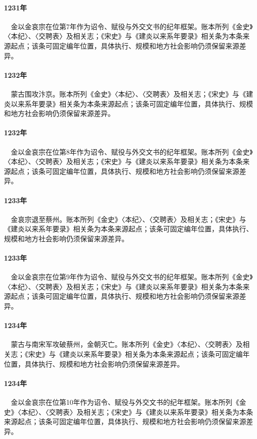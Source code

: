 \paragraph{1231年}　金以金哀宗在位第7年作为诏令、赋役与外交文书的纪年框架。账本所列《金史》〈本纪〉、〈交聘表〉及相关志；《宋史》与《建炎以来系年要录》相关条为本条来源起点；该条可固定编年位置，具体执行、规模和地方社会影响仍须保留来源差异。

\paragraph{1232年}　蒙古围攻汴京。账本所列《金史》〈本纪〉、〈交聘表〉及相关志；《宋史》与《建炎以来系年要录》相关条为本条来源起点；该条可固定编年位置，具体执行、规模和地方社会影响仍须保留来源差异。

\paragraph{1232年}　金以金哀宗在位第8年作为诏令、赋役与外交文书的纪年框架。账本所列《金史》〈本纪〉、〈交聘表〉及相关志；《宋史》与《建炎以来系年要录》相关条为本条来源起点；该条可固定编年位置，具体执行、规模和地方社会影响仍须保留来源差异。

\paragraph{1233年}　金哀宗退至蔡州。账本所列《金史》〈本纪〉、〈交聘表〉及相关志；《宋史》与《建炎以来系年要录》相关条为本条来源起点；该条可固定编年位置，具体执行、规模和地方社会影响仍须保留来源差异。

\paragraph{1233年}　金以金哀宗在位第9年作为诏令、赋役与外交文书的纪年框架。账本所列《金史》〈本纪〉、〈交聘表〉及相关志；《宋史》与《建炎以来系年要录》相关条为本条来源起点；该条可固定编年位置，具体执行、规模和地方社会影响仍须保留来源差异。

\paragraph{1234年}　蒙古与南宋军攻破蔡州，金朝灭亡。账本所列《金史》〈本纪〉、〈交聘表〉及相关志；《宋史》与《建炎以来系年要录》相关条为本条来源起点；该条可固定编年位置，具体执行、规模和地方社会影响仍须保留来源差异。

\paragraph{1234年}　金以金哀宗在位第10年作为诏令、赋役与外交文书的纪年框架。账本所列《金史》〈本纪〉、〈交聘表〉及相关志；《宋史》与《建炎以来系年要录》相关条为本条来源起点；该条可固定编年位置，具体执行、规模和地方社会影响仍须保留来源差异。
